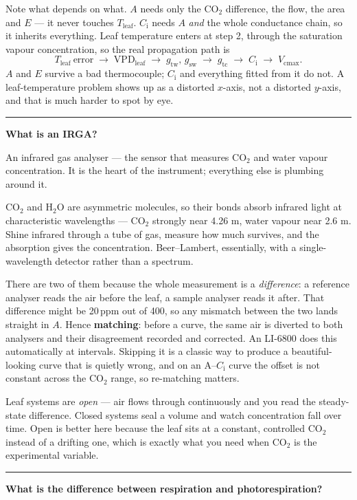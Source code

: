 \documentclass[11pt,letterpaper]{article}
\newcommand{\Vcmax}{\ensuremath{V_{\mathrm{cmax}}}}
\newcommand{\Ci}{\ensuremath{C_{\mathrm{i}}}}
\newcommand{\question}[1]{%
  \vspace{1.5em}%
  {\noindent\color{rulegray}\rule{\textwidth}{0.4pt}\par}%
  \vspace{0.7em}%
  {\noindent\color{accent}\bfseries #1\par}%
  \vspace{0.6em}%
}
\begin{document}
Note what depends on what. $A$ needs only the CO$_2$ difference, the flow, the
area and $E$ --- it never touches $T_{\mathrm{leaf}}$. \Ci{} needs $A$
\emph{and} the whole conductance chain, so it inherits everything. Leaf
temperature enters at step 2, through the saturation vapour concentration, so
the real propagation path is
\[
T_{\mathrm{leaf}}\ \text{error} \;\to\; \mathrm{VPD}_{\mathrm{leaf}} \;\to\;
g_{\mathrm{tw}},\, g_{\mathrm{sw}} \;\to\; g_{\mathrm{tc}} \;\to\; \Ci \;\to\;
\Vcmax .
\]
$A$ and $E$ survive a bad thermocouple; \Ci{} and everything fitted from it do
not. A leaf-temperature problem shows up as a distorted $x$-axis, not a
distorted $y$-axis, and that is much harder to spot by eye.

\question{What is an IRGA?}

An infrared gas analyser --- the sensor that measures CO$_2$ and water vapour
concentration. It is the heart of the instrument; everything else is plumbing
around it.

CO$_2$ and H$_2$O are asymmetric molecules, so their bonds absorb infrared light
at characteristic wavelengths --- CO$_2$ strongly near 4.26 \textmu m, water
vapour near 2.6 \textmu m. Shine infrared through a tube of gas, measure how
much survives, and the absorption gives the concentration. Beer--Lambert,
essentially, with a single-wavelength detector rather than a spectrum.

There are two of them because the whole measurement is a \emph{difference}: a
reference analyser reads the air before the leaf, a sample analyser reads it
after. That difference might be 20\,ppm out of 400, so any mismatch between the
two lands straight in $A$. Hence \textbf{matching}: before a curve, the same air
is diverted to both analysers and their disagreement recorded and corrected. An
LI-6800 does this automatically at intervals. Skipping it is a classic way to
produce a beautiful-looking curve that is quietly wrong, and on an A--\Ci{}
curve the offset is not constant across the CO$_2$ range, so re-matching matters.

Leaf systems are \emph{open} --- air flows through continuously and you read the
steady-state difference. Closed systems seal a volume and watch concentration
fall over time. Open is better here because the leaf sits at a constant,
controlled CO$_2$ instead of a drifting one, which is exactly what you need when
CO$_2$ is the experimental variable.

\question{What is the difference between respiration and photorespiration?}
\end{document}
